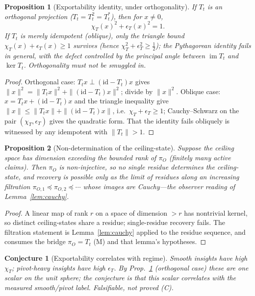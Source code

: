 \documentclass[11pt]{article}
\newtheorem{proposition}{Proposition}
\newtheorem*{conjecture}{Conjecture}
\theoremstyle{definition}
\theoremstyle{remark}
\begin{document}
\begin{proposition}[Exportability identity, under orthogonality]\label{prop:chi}
If $T_t$ is an orthogonal projection ($T_t=T_t^2=T_t^{*}$), then for $x\neq0$,
\[
  \chi_T(x)^2+\epsilon_T(x)^2=1 .
\]
If $T_t$ is merely idempotent (oblique), only the triangle bound
$\chi_T(x)+\epsilon_T(x)\ge1$ survives (hence $\chi_T^2+\epsilon_T^2\ge\tfrac12$); the Pythagorean
identity fails in general, with the defect controlled by the principal angle between
$\operatorname{im}T_t$ and $\ker T_t$. Orthogonality must not be smuggled in.
\end{proposition}

\begin{proof}
Orthogonal case: $T_tx\perp(\mathrm{id}-T_t)x$ gives
$\|x\|^2=\|T_tx\|^2+\|(\mathrm{id}-T_t)x\|^2$; divide by $\|x\|^2$. Oblique case:
$x=T_tx+(\mathrm{id}-T_t)x$ and the triangle inequality give
$\|x\|\le\|T_tx\|+\|(\mathrm{id}-T_t)x\|$, i.e.\ $\chi_T+\epsilon_T\ge1$; Cauchy--Schwarz on the
pair $(\chi_T,\epsilon_T)$ gives the quadratic form. That the identity fails obliquely is witnessed
by any idempotent with $\|T_t\|>1$.
\end{proof}

\begin{proposition}[Non-determination of the ceiling-state]\label{prop:skeleton}
Suppose the ceiling space has dimension exceeding the bounded rank of $\pi_O$ (finitely many active
claims). Then $\pi_O$ is non-injective, so no single residue determines the ceiling-state, and
recovery is possible only as the limit of residues along an increasing filtration
$\pi_{O,1}\preceq\pi_{O,2}\preceq\cdots$ whose images are Cauchy---the observer reading of
Lemma~\ref{lem:cauchy}.
\end{proposition}

\begin{proof}
A linear map of rank $r$ on a space of dimension $>r$ has nontrivial kernel, so distinct
ceiling-states share a residue; single-residue recovery fails. The filtration statement is
Lemma~\ref{lem:cauchy} applied to the residue sequence, and consumes the bridge $\pi_O=T_t$ (M) and
that lemma's hypotheses.
\end{proof}

\begin{conjecture}[Exportability correlates with regime]
Smooth insights have high $\chi_T$; pivot-heavy insights have high $\epsilon_T$. By
Prop.~\ref{prop:chi} (orthogonal case) these are one scalar on the unit sphere; the conjecture is
that this scalar correlates with the measured smooth/pivot label. Falsifiable, not proved (C).
\end{conjecture}
\end{document}
